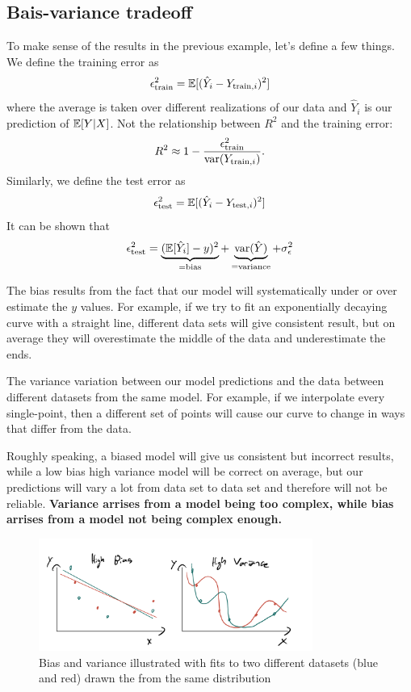 \subsection{Bais-variance tradeoff}
To make sense of the results in the previous example, let's define a few things. We define the training error as
\begin{equation}
\epsilon_{\rm train}^2= \mathbb E[(\hat{Y}_i - Y_{{\rm train},i})^2]
\end{equation}
where the average is taken over different realizations of our data and $\hat{Y}_i$ is our prediction of $\mathbb E[Y|X]$. Not the relationship between $R^2$ and the training error: 
\begin{equation}
R^2 \approx 1 - \frac{\epsilon_{\rm train}^2}{{\rm var}(Y_{{\rm train},i})}.
\end{equation}
Similarly, we define the test error as 
\begin{equation}
\epsilon_{\rm test}^2= \mathbb E[(\hat{Y}_i - Y_{{\rm test},i})^2]
\end{equation}
It can be shown that 
\begin{equation}
\epsilon_{\rm test}^2 = \underbrace{(\mathbb E[\hat{Y}_i]-y)^2}_{={\rm bias}}+ \underbrace{{\rm var}(\hat{Y})}_{={\rm variance}} + \sigma_{\epsilon}^2
\end{equation}

The {\dfn bias} results from the fact that our model will systematically under or over estimate the $y$ values. For example, if we try to fit an exponentially decaying curve with a straight line, different data sets will give consistent result, but on average they will overestimate the middle of the data and underestimate the ends. 

The {\dfn variance} variation between our model predictions and the data between different datasets from the same model. For example, if we interpolate every single-point, then a different set of points will cause our curve to change in ways that differ from the data. 

Roughly speaking, a biased model will give us consistent but incorrect results, while a low bias high variance model will be correct on average, but our predictions will vary a lot from data set to data set and therefore will not be reliable. {\bf Variance arrises from a model being too complex, while bias arrises from a model not being complex enough. }

\begin{figure}[h]
    \centering
    \includegraphics[width=0.8\textwidth]{bias_var}
    \caption{Bias and variance illustrated with fits to two different datasets (blue and red) drawn the from the same distribution}
    \label{fig:bv}
\end{figure}

